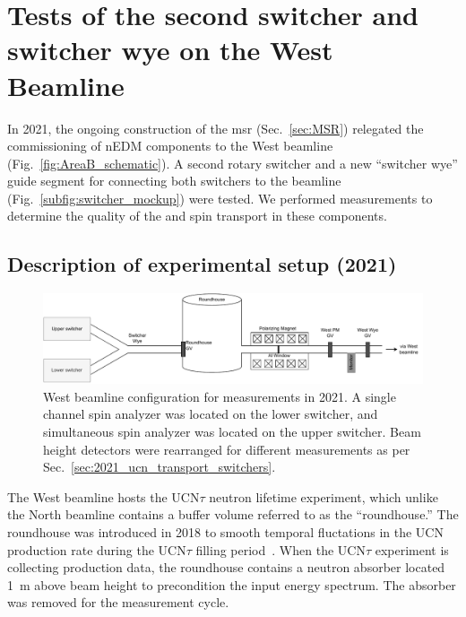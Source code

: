 
\chapter{Tests of the second switcher and switcher wye on the West Beamline}\label{chap:fall2021}


In 2021, the ongoing construction of the \acrshort{msr} (Sec.~\ref{sec:MSR}) relegated the commissioning of nEDM components to the West beamline (Fig.~\ref{fig:AreaB_schematic}). A second rotary switcher and a new ``switcher wye'' guide segment for connecting both switchers to the beamline (Fig.~\ref{subfig:switcher_mockup}) were tested. We performed measurements to determine the quality of the \ucn and \ucn spin transport in these components.


\section{Description of experimental setup (2021)}\label{sec:2021_experimental_setup}


\begin{figure}[h]
    \centering
    \includegraphics[width=\textwidth]{figures/westbeamline_2021.pdf}
    \caption[West beamline configuration for measurements in 2021.]
    {West beamline configuration for measurements in 2021. A single channel spin analyzer was located on the lower switcher, and simultaneous spin analyzer was located on the upper switcher. Beam height detectors were rearranged for different measurements as per Sec.~\ref{sec:2021_ucn_transport_switchers}.}\label{fig:west_beamline_2021}
\end{figure}

The West beamline hosts the UCN$\tau$ neutron lifetime experiment, which unlike the North beamline contains a buffer volume referred to as the ``roundhouse.'' The roundhouse was introduced in 2018 to smooth temporal fluctations in the UCN production rate during the UCN$\tau$ filling period~\cite{gonzalez_ucn_tau}. When the UCN$\tau$ experiment is collecting production data, the roundhouse contains a neutron absorber located \qty{1}{m} above beam height to precondition the input \ucn energy spectrum. The absorber was removed for the measurement cycle. 

